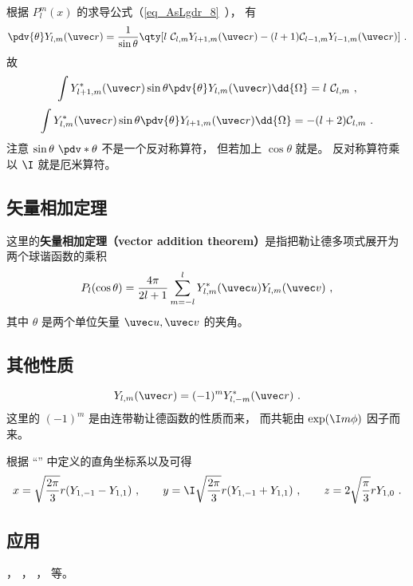 根据 $P_l^m(x)$ 的求导公式（\autoref{eq_AsLgdr_8}~）， 有
\begin{equation}\label{eq_SphHar_18} %
\pdv{\theta}Y_{l,m}(\uvec r) = \frac{1}{\sin\theta}\qty[l\ \mathcal C_{l,m}Y_{l+1, m}(\uvec r)  -(l+1)\mathcal C_{l-1,m}Y_{l-1, m}(\uvec r)]~.
\end{equation}
故
\begin{equation} %
\int Y^*_{l+1, m}(\uvec r)\sin\theta\pdv{\theta}Y_{l,m}(\uvec r)\dd{\Omega} = l\ \mathcal C_{l,m}~,
\end{equation}
\begin{equation} %
\int Y^*_{l, m}(\uvec r)\sin\theta\pdv{\theta}Y_{l+1,m}(\uvec r)\dd{\Omega} = -(l+2)\mathcal C_{l,m}~.
\end{equation}
注意 $\sin\theta\ \pdv*{\theta}$ 不是一个反对称算符， 但若加上 $\cos\theta$ 就是。 反对称算符乘以 $\I$ 就是厄米算符。

\subsection{矢量相加定理}
这里的\textbf{矢量相加定理（vector addition theorem）}是指把勒让德多项式展开为两个球谐函数的乘积
\begin{equation}\label{eq_SphHar_10}
P_l(\cos\theta) = \frac{4\pi}{2l+1} \sum_{m=-l}^l Y_{l,m}^*(\uvec u) Y_{l,m}(\uvec v)~,
\end{equation}
其中 $\theta$ 是两个单位矢量 $\uvec u, \uvec v$ 的夹角。

\subsection{其他性质}
\begin{equation}\label{eq_SphHar_6}
Y_{l,m}(\uvec r) = (-1)^m Y_{l,-m}^*(\uvec r)~.
\end{equation}
这里的 $(-1)^m$ 是由连带勒让德函数的性质而来， 而共轭由 $\exp(\I m\phi)$ 因子而来。

根据 “” 中定义的直角坐标系以及可得
\begin{equation}\label{eq_SphHar_4}
x = \sqrt{\frac{2\pi}{3}} r (Y_{1,-1} - Y_{1,1})~, \qquad
y = \I \sqrt{\frac{2\pi}{3}} r (Y_{1,-1}+Y_{1,1})~, \qquad
z =2\sqrt{\frac{\pi}{3}} rY_{1,0}~.
\end{equation}

\subsection{应用}
， ， ， 等。
